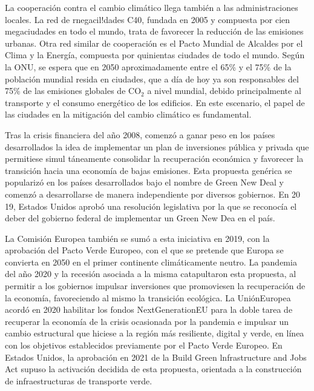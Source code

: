 \documentclass[10pt,a4paper]{article}
\begin{document}
La cooperación contra el cambio climático llega también a las administraciones locales. La red de rnegacil!dades C40, fundada en 2005 y compuesta por cien megaciudades en todo el mundo, trata de favorecer la reducción de las emisiones urbanas. Otra red similar de cooperación es el Pacto Mundial de Alcaldes por el Clima y la Energía, compuesta por quinientas ciudades de todo el mundo. Según la ONU, se espera que en 2050 aproximadamente entre el 65\% y el 75\% de la población mundial resida en ciudades, que a día de hoy ya son responsables del 75\% de las emisiones globales de $\text{CO}_2$ a nivel mundial, debido principalmente al transporte y el consumo energético de los edificios. En este escenario, el papel de las ciudades en la mitigación del cambio climático es fundamental. 

Tras la crisis financiera del año 2008, comenzó a ganar peso en los países desarrollados la idea de implementar un plan de inversiones pública y privada que permitiese simul táneamente consolidar la recuperación económica y favorecer la transición hacia una economía de bajas emisiones. Esta propuesta genérica se popularizó en los países desarrollados bajo el nombre de Green New Deal y comenzó a desarrollarse de manera independiente por diversos gobiernos. En 20 19, Estados Unidos aprobó una resolución legislativa por la que se reconocía el deber del gobierno federal de implementar un Green New Dea en el país. 

La Comisión Europea también se sumó a esta iniciativa en 2019, con la aprobación del Pacto Verde Europeo, con el que se pretende que Europa se convierta en 2050 en el primer continente climáticamente neutro. La pandemia del año 2020 y la recesión asociada a la misma catapultaron esta propuesta, al permitir a los gobiernos impulsar inversiones que promoviesen la recuperación de la economía, favoreciendo al mismo la transición ecológica. La UniónEuropea acordó en 2020 habilitar los fondos NextGenerationEU para la doble tarea de recuperar la economía de la crisis ocasionada por la pandemia e impulsar un cambio estructural que hiciese a la región más resiliente, digital y verde, en línea con los objetivos establecidos previamente por el Pacto Verde Europeo. En Estados Unidos, la aprobación en 2021 de la Build Green lnfrastructure and Jobs Act supuso la activación decidida de esta propuesta, orientada a la construcción de infraestructuras de transporte verde. 
\end{document}
